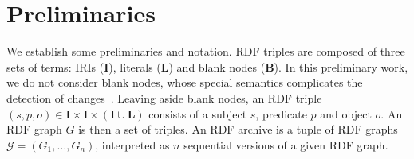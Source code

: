 \documentclass{llncs}
\newcommand{\B}{\ensuremath{\mathbf{B}}\xspace}
\newcommand{\I}{\ensuremath{\mathbf{I}}\xspace}
\renewcommand{\L}{\ensuremath{\mathbf{L}}\xspace}
\begin{document}












\section{Preliminaries}

We establish some preliminaries and notation. RDF triples are composed of three sets of terms: IRIs (\I), literals (\L) and blank nodes (\B). In this preliminary work, we do not consider blank nodes, whose special semantics complicates the detection of changes~\cite{ZeginisTC11}. Leaving aside blank nodes, an RDF triple $(s,p,o) \in \I \times \I \times (\I \cup \L)$ consists of a subject $s$, predicate $p$ and object $o$. An RDF graph $G$ is then a set of triples. An RDF archive is a tuple of RDF graphs $\mathcal{G} = (G_1,\ldots,G_n)$, interpreted as $n$ sequential versions of a given RDF graph. 
\end{document}
